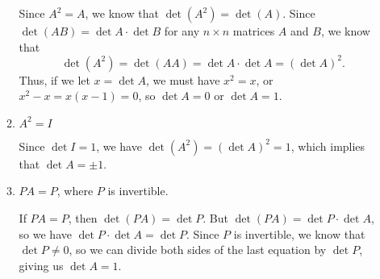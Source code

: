 \documentclass[12pt]{article}
\begin{document}
\begin{enumerate}
\begin{enumerate}
\medskip

Since $A^2=A$, we know that $\det (A^2) = \det (A)$. Since $\det (AB) = \det A\cdot \det B$ for any $n\times n$ matrices $A$ and $B$, we know that
\[
 \det(A^2) = \det(AA) = \det A\cdot \det A = (\det A)^2.
\]
Thus, if we let $x=\det A$, we must have $x^2=x$, or $x^2-x = x(x-1)=0$, so $\det A=0$ or $\det A=1$.

 \item $A^2 = I$

\medskip

Since $\det I = 1$, we have $\det (A^2) = (\det A)^2 = 1$, which implies that $\det A = \pm 1$.

 \item $PA=P$, where $P$ is invertible.

\medskip

If $PA=P$, then $\det (PA) = \det P$. But $\det (PA) = \det P\cdot \det A$, so we have $\det P \cdot \det A = \det P$. Since $P$ is invertible, we know that $\det P\neq 0$, so we can divide both sides of the last equation by $\det P$, giving us $\det A = 1$.
\end{enumerate}



 \end{enumerate}
\end{document}
